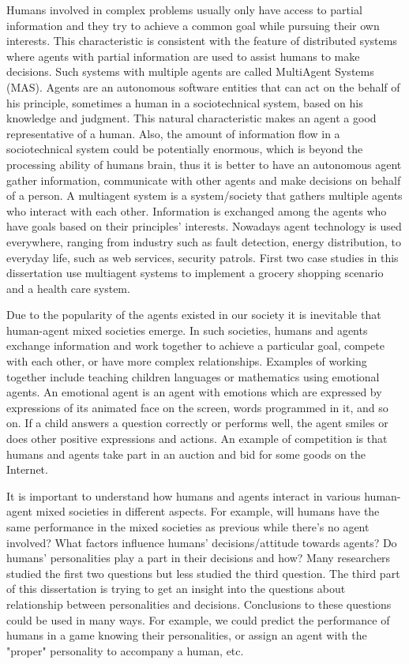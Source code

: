 Humans involved in complex problems usually only have access to partial information and they try to achieve a common goal while pursuing their own interests. This characteristic is consistent with the feature of distributed systems where agents with partial information are used to assist humans to make decisions. Such systems with multiple agents are called MultiAgent Systems (MAS). Agents are an autonomous software entities that can act on the behalf of his principle, sometimes a human in a sociotechnical system, based on his knowledge and judgment. This natural characteristic makes an agent a good representative of a human. Also, the amount of information flow in a sociotechnical system could be potentially enormous, which is beyond the processing ability of humans brain, thus it is better to have an autonomous agent gather information, communicate with other agents and make decisions on behalf of a person. A multiagent system is a system/society that gathers multiple agents who interact with each other. Information is exchanged among the agents who have goals based on their principles' interests. Nowadays agent technology is used everywhere, ranging from industry such as fault detection, energy distribution, to everyday life, such as web services, security patrols. First two case studies in this dissertation use multiagent systems to implement a grocery shopping scenario and a health care system.

Due to the popularity of the agents existed in our society it is inevitable that human-agent mixed societies emerge. In such societies, humans and agents exchange information and work together to achieve a particular goal, compete with each other, or have more complex relationships. Examples of working together include teaching children languages or mathematics using emotional agents. An emotional agent is an agent with emotions which are expressed by expressions of its animated face on the screen, words programmed in it, and so on. If a child answers a question correctly or performs well, the agent smiles or does other positive expressions and actions. An example of competition is that humans and agents take part in an auction and bid for some goods on the Internet. 

It is important to understand how humans and agents interact in various human-agent mixed societies in different aspects. For example, will humans have the same performance in the mixed societies as previous while there's no agent involved? What factors influence humans' decisions/attitude towards agents? Do humans' personalities play a part in their decisions and how? Many researchers studied the first two questions but less studied the third question. The third part of this dissertation is trying to get an insight into the questions about relationship between personalities and decisions. Conclusions to these questions could be used in many ways. For example, we could predict the performance of humans in a game knowing their personalities, or assign an agent with the "proper" personality to accompany a human, etc.     

